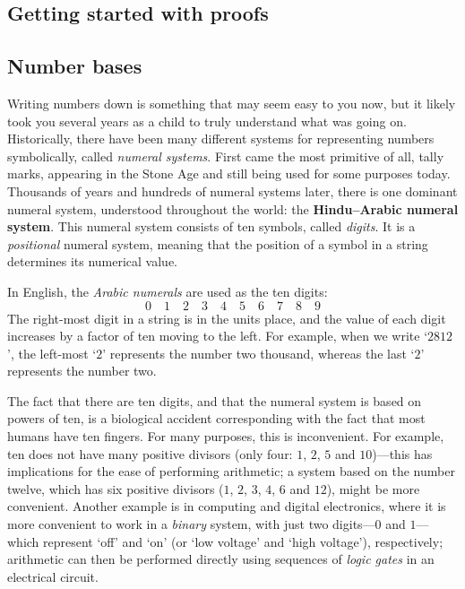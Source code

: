 \subsection*{Getting started with proofs}




\subsection*{Number bases}

Writing numbers down is something that may seem easy to you now, but it likely took you several years as a child to truly understand what was going on. Historically, there have been many different systems for representing numbers symbolically, called \textit{numeral systems}. First came the most primitive of all, tally marks, appearing in the Stone Age and still being used for some purposes today. Thousands of years and hundreds of numeral systems later, there is one dominant numeral system, understood throughout the world: the \textbf{Hindu--Arabic numeral system}. This numeral system consists of ten symbols, called \textit{digits}. It is a \textit{positional} numeral system, meaning that the position of a symbol in a string determines its numerical value.

In English, the \textit{Arabic numerals} are used as the ten digits:
\[ 0 \quad 1 \quad 2 \quad 3 \quad 4 \quad 5 \quad 6 \quad 7 \quad 8 \quad 9 \]
The right-most digit in a string is in the units place, and the value of each digit increases by a factor of ten moving to the left. For example, when we write `$2812$', the left-most `$2$' represents the number two thousand, whereas the last `$2$' represents the number two.

The fact that there are ten digits, and that the numeral system is based on powers of ten, is a biological accident corresponding with the fact that most humans have ten fingers. For many purposes, this is inconvenient. For example, ten does not have many positive divisors (only four: $1$, $2$, $5$ and $10$)---this has implications for the ease of performing arithmetic; a system based on the number twelve, which has six positive divisors ($1$, $2$, $3$, $4$, $6$ and $12$), might be more convenient. Another example is in computing and digital electronics, where it is more convenient to work in a \textit{binary} system, with just two digits---$0$ and $1$---which represent `off' and `on' (or `low voltage' and `high voltage'), respectively; arithmetic can then be performed directly using sequences of \textit{logic gates} in an electrical circuit.

